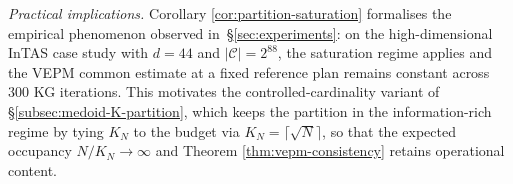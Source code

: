 \noindent\emph{Practical implications.}  Corollary
\ref{cor:partition-saturation} formalises the empirical phenomenon
observed in~\S\ref{sec:experiments}: on the high-dimensional InTAS
case study with $d=44$ and $|\mathcal{C}|=2^{88}$, the saturation
regime applies and the VEPM common estimate at a fixed reference plan
remains constant across $300$ KG iterations.  This motivates the
controlled-cardinality variant of \S\ref{subsec:medoid-K-partition},
which keeps the partition in the information-rich regime by tying
$K_{N}$ to the budget via $K_{N}=\lceil\sqrt{N}\rceil$, so that the
expected occupancy $N/K_{N}\to\infty$ and Theorem
\ref{thm:vepm-consistency} retains operational content.

%
